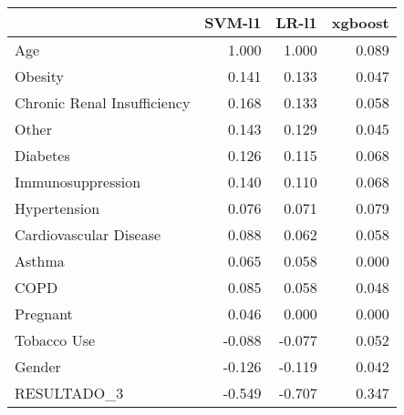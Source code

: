 \begin{tabular}{lrrr}
\toprule
{} &  SVM-l1 &  LR-l1 &  xgboost \\
\midrule
Age                         &   1.000 &  1.000 &    0.089 \\
Obesity                     &   0.141 &  0.133 &    0.047 \\
Chronic Renal Insufficiency &   0.168 &  0.133 &    0.058 \\
Other                       &   0.143 &  0.129 &    0.045 \\
Diabetes                    &   0.126 &  0.115 &    0.068 \\
Immunosuppression           &   0.140 &  0.110 &    0.068 \\
Hypertension                &   0.076 &  0.071 &    0.079 \\
Cardiovascular Disease      &   0.088 &  0.062 &    0.058 \\
Asthma                      &   0.065 &  0.058 &    0.000 \\
COPD                        &   0.085 &  0.058 &    0.048 \\
Pregnant                    &   0.046 &  0.000 &    0.000 \\
Tobacco Use                 &  -0.088 & -0.077 &    0.052 \\
Gender                      &  -0.126 & -0.119 &    0.042 \\
RESULTADO\_3                 &  -0.549 & -0.707 &    0.347 \\
\bottomrule
\end{tabular}
